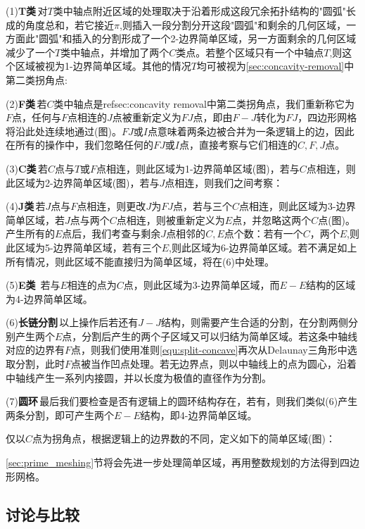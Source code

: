 (1)\textbf{T类}\,对$T$类中轴点附近区域的处理取决于沿着形成这段冗余拓扑结构的"圆弧"长成的角度总和，若它接近$\pi$,则插入一段分割分开这段"圆弧"和剩余的几何区域，一方面此"圆弧"和插入的分割形成了一个2-边界简单区域，另一方面剩余的几何区域减少了一个$T$类中轴点，并增加了两个$C$类点。若整个区域只有一个中轴点$T$,则这个区域被视为1-边界简单区域。其他的情况$T$均可被视为\ref{sec:concavity-removal}中第二类拐角点:

(2)\textbf{F类}\,若$C$类中轴点是ref{sec:concavity removal}中第二类拐角点，我们重新称它为$F$点，任何与$F$点相连的$J$点被重新定义为$FJ$点，即由$F-J$转化为$FJ$，四边形网格将沿此处连续地通过(图)。$FJ$或$I$点意味着两条边被合并为一条逻辑上的边，因此在所有的操作中，我们忽略任何的$FJ$或$I$点，直接考察与它们相连的$C,F,J$点。

(3)\textbf{C类}\,若$C$点与$T$或$F$点相连，则此区域为1-边界简单区域(图)，若与$C$点相连，则此区域为2-边界简单区域(图)，若与$J$点相连，则我们之间考察：

(4)\textbf{J类}\,若$J$点与$F$点相连，则更改$J$为$FJ$点，若与三个$C$点相连，则此区域为3-边界简单区域，若$J$点与两个$C$点相连，则被重新定义为$E$点，并忽略这两个$C$点(图)。产生所有的$E$点后，我们考查与剩余$J$点相邻的$C,E$点个数：若有一个$C$，两个$E$,则此区域为5-边界简单区域，若有三个$E$,则此区域为6-边界简单区域。若不满足如上所有情况，则此区域不能直接归为简单区域，将在(6)中处理。

(5)\textbf{E类}\, 若与$E$相连的点为$C$点，则此区域为3-边界简单区域，而$E-E$结构的区域为4-边界简单区域。

(6)\textbf{长链分割}\,以上操作后若还有$J-J$结构，则需要产生合适的分割，在分割两侧分别产生两个$E$点，分割后产生的两个子区域又可以归结为简单区域。若这条中轴线对应的边界有$F$点，则我们使用准则\ref{equ:split-concave}再次从Delaunay三角形中选取分割，此时$F$点被当作凹点处理。若无边界点，则以中轴线上的点为圆心，沿着中轴线产生一系列内接圆，并以长度为极值的直径作为分割。

(7)\textbf{圆环}\,最后我们要检查是否有逻辑上的圆环结构存在，若有，则我们类似(6)产生两条分割，即可产生两个$E-E$结构，即4-边界简单区域。

\begin{definition}\label{def:prime}
	仅以$C$点为拐角点，根据逻辑上的边界数的不同，定义如下的简单区域(图)：
\end{definition}

\ref{sec:prime_meshing}节将会先进一步处理简单区域，再用整数规划的方法得到四边形网格。

\subsection{讨论与比较}\label{sec:discuss}

